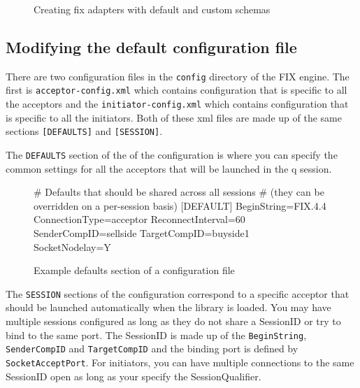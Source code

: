 \begin{figure}[H]
\caption{Creating fix adapters with default and custom schemas}
\end{figure}

\subsection{Modifying the default configuration file}
There are two configuration files in the \verb|config| directory of the FIX engine. The first
is \verb|acceptor-config.xml| which contains configuration that is specific to all the acceptors
and the \verb|initiator-config.xml| which contains configuration that is specific to all the initiators. Both of these xml files are made up of the same sections \verb|[DEFAULTS]| and \verb|[SESSION]|. 

The \verb|DEFAULTS| section of the of the configuration is where you can specify the common settings for all the acceptors that will be launched in the q session.

\begin{figure}[H]
\begin{inicode}
# Defaults that should be shared across all sessions
# (they can be overridden on a per-session basis)
[DEFAULT]
BeginString=FIX.4.4
ConnectionType=acceptor
ReconnectInterval=60
SenderCompID=sellside
TargetCompID=buyside1
SocketNodelay=Y
\end{inicode}
\caption{Example defaults section of a configuration file}
\end{figure}

The \verb|SESSION| sections of the configuration correspond to a specific acceptor that should be 
launched automatically when the library is loaded. You may have multiple sessions configured as long
as they do not share a SessionID or try to bind to the same port. The SessionID is made up of the \verb|BeginString|, \verb|SenderCompID| and \verb|TargetCompID| and the binding port is defined by
\verb|SocketAcceptPort|. For initiators, you can have multiple connections to the same SessionID open as long as your specify the SessionQualifier. 

